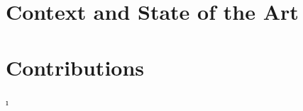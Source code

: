 \documentclass[
11pt, %
english, %
singlespacing, %
headsepline, %
]{MastersDoctoralThesis} %
\theoremstyle{remark}
\begin{document}
\part{Context and State of the Art}

 

\part{Contributions}
% 
% 
 


\i%


%

\appendix %


%




%


\printbibliography[heading=bibintoc]

\end{document}

